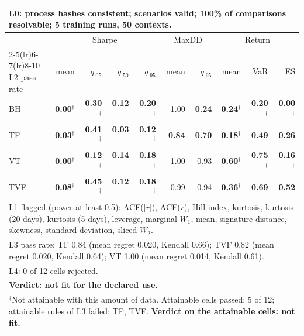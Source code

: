 \begin{tabular}{lrrrrrrrrr}
\toprule
\multicolumn{10}{p{13.5cm}}{L0: process hashes consistent; scenarios valid; 100\% of comparisons resolvable; 5 training runs, 50 contexts.} \\
\midrule
 & \multicolumn{4}{c}{Sharpe} & \multicolumn{2}{c}{MaxDD} & \multicolumn{3}{c}{Return} \\
\cmidrule(lr){2-5}\cmidrule(lr){6-7}\cmidrule(lr){8-10}
L2 pass rate & mean & $q_{.05}$ & $q_{.50}$ & $q_{.95}$ & mean & $q_{.95}$ & mean & VaR & ES \\
\midrule
BH & \textbf{0.00}$^{\dagger}$ & \textbf{0.30}$^{\dagger}$ & \textbf{0.12}$^{\dagger}$ & \textbf{0.20}$^{\dagger}$ & 1.00 & \textbf{0.24} & \textbf{0.24}$^{\dagger}$ & \textbf{0.20}$^{\dagger}$ & \textbf{0.00}$^{\dagger}$ \\
TF & \textbf{0.03}$^{\dagger}$ & \textbf{0.41}$^{\dagger}$ & \textbf{0.03}$^{\dagger}$ & \textbf{0.12}$^{\dagger}$ & \textbf{0.84} & \textbf{0.70} & \textbf{0.18}$^{\dagger}$ & \textbf{0.49} & \textbf{0.26} \\
VT & \textbf{0.00}$^{\dagger}$ & \textbf{0.12}$^{\dagger}$ & \textbf{0.14}$^{\dagger}$ & \textbf{0.18}$^{\dagger}$ & 1.00 & 0.93 & \textbf{0.60}$^{\dagger}$ & \textbf{0.75}$^{\dagger}$ & \textbf{0.16}$^{\dagger}$ \\
TVF & \textbf{0.08}$^{\dagger}$ & \textbf{0.45}$^{\dagger}$ & \textbf{0.12}$^{\dagger}$ & \textbf{0.18}$^{\dagger}$ & 0.99 & 0.94 & \textbf{0.36}$^{\dagger}$ & \textbf{0.69} & \textbf{0.52} \\
\midrule
\multicolumn{10}{p{13.5cm}}{L1 flagged (power at least 0.5): ACF($|r|$), ACF($r$), Hill index, kurtosis, kurtosis (20 days), kurtosis (5 days), leverage, marginal $W_1$, mean, signature distance, skewness, standard deviation, sliced $W_2$.} \\
\multicolumn{10}{p{13.5cm}}{L3 pass rate: TF 0.84 (mean regret 0.020, Kendall 0.66); TVF 0.82 (mean regret 0.020, Kendall 0.64); VT 1.00 (mean regret 0.014, Kendall 0.61).} \\
\multicolumn{10}{p{13.5cm}}{L4: 0 of 12 cells rejected.} \\
\multicolumn{10}{p{13.5cm}}{\textbf{Verdict: not fit for the declared use.}} \\
\multicolumn{10}{p{13.5cm}}{$^{\dagger}$Not attainable with this amount of data. Attainable cells passed: 5 of 12; attainable rules of L3 failed: TF, TVF. \textbf{Verdict on the attainable cells: not fit.}} \\
\bottomrule
\end{tabular}
